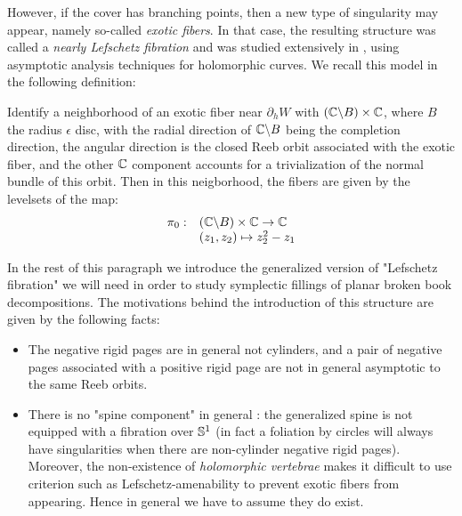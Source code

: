 \documentclass[../main.tex]{subfiles}
\begin{document}
However, if the cover has branching points, then a new type of singularity may appear, namely so-called \textit{exotic fibers}. In that case, the resulting structure was called a \textit{nearly Lefschetz fibration} and was studied extensively in \cite{min_spinal_2024}, using asymptotic analysis techniques for holomorphic curves. We recall this model in the following definition:

\begin{definition}\label{d:exotic_coo}

Identify a neighborhood of an exotic fiber near $\partial_h W$ with $(\mathbb{C}\backslash B)\times \mathbb{C}$, where $B$ the radius $\epsilon $ disc, with the radial direction of $\mathbb{C}\backslash B$ being the completion direction, the angular direction is the closed Reeb orbit associated with the exotic fiber, and the other $\mathbb{C}$ component accounts for a trivialization of the normal bundle of this orbit. Then in this neigborhood, the fibers are given by the levelsets of the map: 
\begin{equation*}
    \begin{array}{ll}
        \pi_0 : &(\mathbb{C}\backslash B)\times \mathbb{C} \rightarrow \mathbb{C}\\
                & (z_1,z_2) \mapsto z_2^2 - z_1
    \end{array}
\end{equation*} 

\end{definition}
\text{}
\newline

In the rest of this paragraph we introduce the generalized version of "Lefschetz fibration" we will need in order to study symplectic fillings of planar broken book decompositions. The motivations behind the introduction of this structure are given by the following facts:\\
\begin{itemize}
    \item The negative rigid pages are in general not cylinders, and a pair of negative pages associated with a positive rigid page are not in general asymptotic to the same Reeb orbits. 
    \item There is no "spine component" in general : the generalized spine is not equipped with a fibration over $\mathbb{S}^1$ (in fact a foliation by circles will always have singularities when there are non-cylinder negative rigid pages). Moreover, the non-existence of \textit{holomorphic vertebrae} makes it difficult to use criterion such as Lefschetz-amenability to prevent exotic fibers from appearing. Hence in general we have to assume they do exist. 
\end{itemize}
\end{document}
